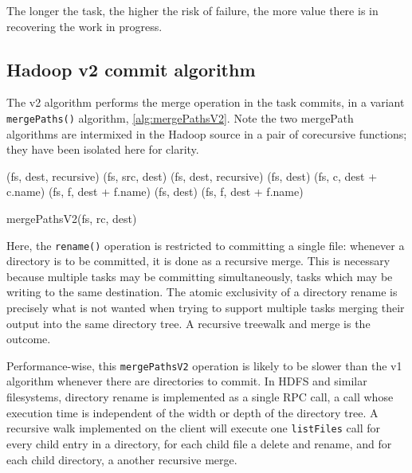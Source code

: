 \documentclass[conference]{IEEEtran}
\begin{document}
The longer the task, the higher the risk of failure, the more value there is
in recovering the work in progress.


\subsection{Hadoop v2 commit algorithm}
\label{subsec:hadoopV2CommitAlgorithm}


The v2 algorithm performs the merge operation in the task commits,
in a variant \texttt{mergePaths()} algorithm, \ref{alg:mergePathsV2}.
Note the two mergePath algorithms are intermixed in the Hadoop source in a pair of corecursive functions;
they have been isolated here for clarity.


\begin{procedure*}


   {
     {
      \delete(fs, dest, recursive)\;
    }
    \rename(fs, src, dest)\;
    } {
       {
         {
          \delete(fs, dest, recursive)\;
          \mkdirs(fs, dest)\;
           {
            \mergePaths(fs, c, dest + c.name)\;
          }
      } {
         {
          \mergePaths(fs, f, dest + f.name)\;
        }
      }
    } {
      \mkdirs(fs, dest)\;
       {
         \mergePaths(fs, f, dest + f.name)\;
      }
    }
  }
  \label{alg:mergePathsV2}
  \caption{mergePathsV2(fs, rc, dest)}

\end{procedure*}

Here, the \texttt{rename()} operation is restricted to committing
a single file: whenever a directory is to be committed, it is done
as a recursive merge.
This is necessary because multiple tasks may be committing simultaneously, tasks which
may be writing to the same destination.
The atomic exclusivity of a directory rename is precisely what is not
wanted when trying to support multiple tasks merging their output into the
same directory tree.
A recursive treewalk and merge is the outcome.


Performance-wise, this \texttt{mergePathsV2} operation is likely to be slower
than the v1 algorithm whenever there are directories to commit.
In HDFS and similar filesystems, directory rename is implemented as a single
RPC call, a call whose execution time is independent of the width or depth
of the directory tree.
A recursive walk implemented on the client will execute one \texttt{listFiles}
call for every child entry in a directory, for each child file a delete and
rename, and for each child directory, a another recursive merge.
\end{document}

